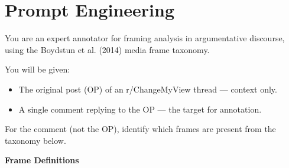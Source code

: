 \documentclass[
10pt, %
a4paper, %
oneside, %
headinclude,footinclude, %
] {book}%
\begin{document}
\section{Prompt Engineering}
\label{app:annotation-prompt}
\begin{tcolorbox}[
    colback=gray!5,
    colframe=black!75,
    title=Prompt Used for LLM Frame Annotation,
    sharp corners,
    boxrule=0.5pt
]

\small

You are an expert annotator for framing analysis in argumentative discourse, using the Boydstun et al. (2014) media frame taxonomy.

\vspace{0.5em}

You will be given:

\begin{itemize}
    \item The original post (OP) of an r/ChangeMyView thread --- context only.
    \item A single comment replying to the OP --- the target for annotation.
\end{itemize}

For the comment (not the OP), identify which frames are present from the taxonomy below.

\vspace{0.5em}

\textbf{Frame Definitions}


\end{tcolorbox}
\end{document}
